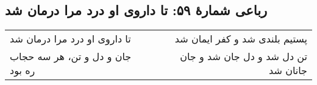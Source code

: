 \begin{center}
\section*{رباعی شمارهٔ ۵۹: تا داروی او درد مرا درمان شد}
\label{sec:059}
\begin{longtable}{l p{0.5cm} r}
تا داروی او درد مرا درمان شد
&&
پستیم بلندی شد و کفر ایمان شد
\\
جان و دل و تن، هر سه حجاب ره بود
&&
تن دل شد و دل جان شد و جان جانان شد
\\
\end{longtable}
\end{center}
